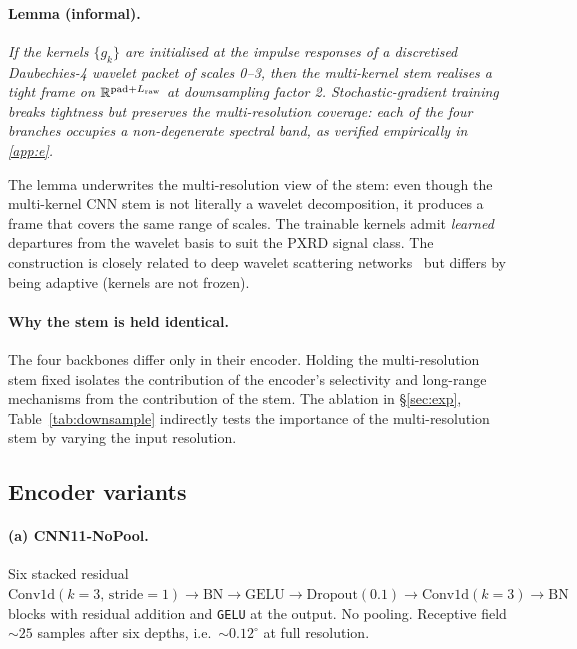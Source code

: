 \documentclass[final]{ws-ijwmip}
\begin{document}
\paragraph{Lemma (informal).}
\emph{If the kernels $\{g_k\}$ are initialised at the impulse responses
of a discretised Daubechies-4 wavelet packet of scales 0--3, then the
multi-kernel stem realises a tight frame on
$\mathbb{R}^{\mathrm{pad}+L_{\rm raw}}$ at downsampling factor 2.
Stochastic-gradient training breaks tightness but preserves the
multi-resolution \emph{coverage}: each of the four branches occupies a
non-degenerate spectral band, as verified empirically in
\ref{app:e}.}

The lemma underwrites the multi-resolution view of the stem: even
though the multi-kernel CNN stem is not literally a wavelet
decomposition, it produces a frame that covers the same range of
scales. The trainable kernels admit \emph{learned} departures from
the wavelet basis to suit the PXRD signal class. The construction is
closely related to deep wavelet scattering networks~\cite{andreux2020kymatio}
but differs by being adaptive (kernels are not frozen).

\paragraph{Why the stem is held identical.}
The four backbones differ only in their encoder. Holding the
multi-resolution stem fixed isolates the contribution of the
encoder's selectivity and long-range mechanisms from the contribution
of the stem. The ablation in \S\ref{sec:exp}, Table~\ref{tab:downsample}
indirectly tests the importance of the multi-resolution stem by
varying the input resolution.


\subsection{Encoder variants}

\paragraph{(a) CNN11-NoPool.}
Six stacked residual
$\mathrm{Conv1d}(k=3,\, \mathrm{stride}=1)\!\to\!\mathrm{BN}\!\to\!
\mathrm{GELU}\!\to\!\mathrm{Dropout}(0.1)\!\to\!\mathrm{Conv1d}(k=3)\!\to\!
\mathrm{BN}$ blocks with residual addition and \texttt{GELU} at the
output. No pooling. Receptive field $\sim 25$ samples after six depths,
i.e.\ $\sim 0.12^\circ$ at full resolution.
\end{document}
